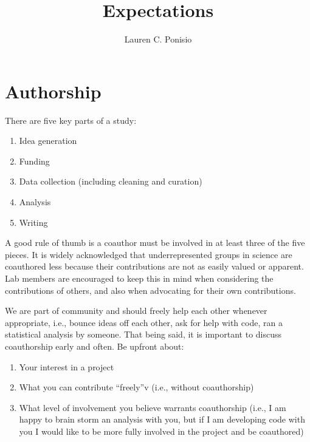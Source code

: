 \documentclass[12pt]{article}
\title{Expectations}
\author{Lauren C. Ponisio}
\begin{document}
\maketitle

\section{Authorship}
There are five key parts of a study:
\begin{enumerate}
\item Idea generation
\item Funding
\item Data collection (including cleaning and curation)
\item Analysis
\item Writing
\end{enumerate}

A good rule of thumb is a coauthor must be involved in at least three
of the five pieces. It is widely acknowledged that underrepresented
groups in science are coauthored less because their contributions are
not as easily valued or apparent. Lab members are encouraged to keep
this in mind when considering the contributions of others, and also
when advocating for their own contributions.

We are part of community and should freely help each other whenever
appropriate, i.e., bounce ideas off each other, ask for help with
code, ran a statistical analysis by someone. That being said, it is
important to discuss coauthorship early and often. Be upfront about:

\begin{enumerate}
\item Your interest in a project
\item What you can contribute ``freely''v (i.e., without coauthorship)
\item What level of involvement you believe warrants coauthorship
  (i.e., I am happy to brain storm an analysis with you, but if I am
  developing code with you I would like to be more fully involved in
  the project and be coauthored)
\end{enumerate}
\end{document}
